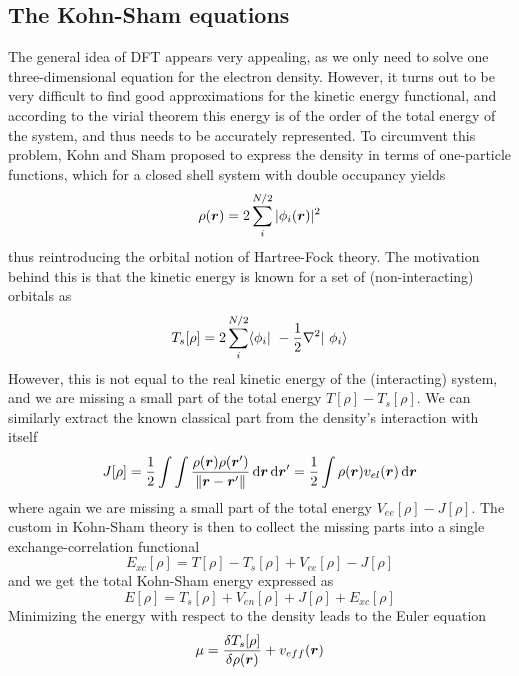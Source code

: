 \subsection{The Kohn-Sham equations}
The general idea of DFT appears very appealing, as we only need to solve one three-dimensional 
equation for the electron density. However, it turns out to be very difficult to find good 
approximations for the kinetic energy functional, and according to the virial theorem this 
energy is of the order of the total energy of the system, and thus needs to be accurately 
represented. To circumvent this problem, Kohn and Sham\cite{Kohn-Sham:1965} proposed to express 
the density in terms of one-particle functions, which for a closed shell system with double 
occupancy yields
\begin{equation}
    \rho(\boldsymbol r) = 2 \sum_i^{N/2} | \phi_i(\boldsymbol r)|^2
\end{equation}
thus reintroducing the orbital notion of Hartree-Fock theory. The motivation behind this is 
that the kinetic energy is known for a set of (non-interacting) orbitals as
\begin{equation}
    T_s[\rho] = 2 \sum_i^{N/2} \langle \orbital_i | -\frac{1}{2}\nabla^2 | \orbital_i \rangle
\end{equation}
However, this is not equal to the real kinetic energy of the (interacting) system, and we are 
missing a small part of the total energy $T[\rho] - T_s[\rho]$. We can similarly extract the 
known classical part from the density's interaction with itself
\begin{equation}
    J[\rho] = \frac{1}{2}\int\int\frac{\rho(\boldsymbol r)\rho(\boldsymbol r')}{\|\boldsymbol r-\boldsymbol r'\|} \,\mathrm{d}\boldsymbol r\,\mathrm{d}\boldsymbol r' 
	= \frac{1}{2} \int \rho(\boldsymbol r)v_{el}(\boldsymbol r) \,\mathrm{d} \boldsymbol r
\end{equation}
where again we are missing a small part of the total energy $V_{ee}[\rho] - J[\rho]$. The custom 
in Kohn-Sham theory is then to collect the missing parts into a single exchange-correlation 
functional
\begin{equation}
    E_{xc}[\rho] = T[\rho] - T_s[\rho] + V_{ee}[\rho] - J[\rho]
\end{equation}
and we get the total Kohn-Sham energy expressed as
\begin{equation}
    \label{eq:KS-energy}
    E[\rho] = T_s[\rho] + V_{en}[\rho] + J[\rho] + E_{xc}[\rho]
\end{equation}
Minimizing the energy with respect to the density leads to the Euler equation
\begin{equation}
    \label{eq:KS-euler}
    \mu = \frac{\delta T_s[\rho]}{\delta \rho(\boldsymbol r)} + v_{eff}(\boldsymbol r)
\end{equation}
